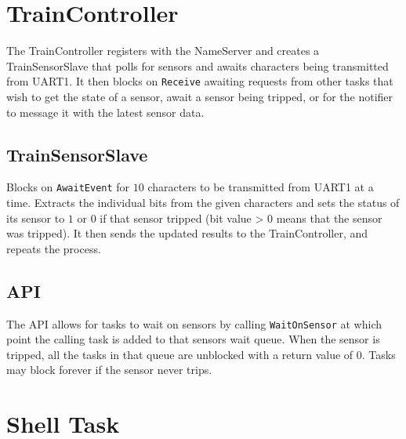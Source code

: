 \documentclass[12pt]{article}
\begin{document}
\section{TrainController}
The TrainController registers with the NameServer and creates a TrainSensorSlave that polls for sensors and awaits characters being transmitted from UART1.  It then blocks on \texttt{Receive} awaiting requests from other tasks that wish to get the state of a sensor, await a sensor being tripped, or for the notifier to message it with the latest sensor data.
\\
\subsection{TrainSensorSlave}
Blocks on \texttt{AwaitEvent} for $10$ characters to be transmitted from UART1 at a time.  Extracts the individual bits from the given characters and sets the status of its sensor to $1$ or $0$ if that sensor tripped (bit value > 0 means that the sensor was tripped).  It then sends the updated results to the TrainController, and repeats the process.
\\[1\baselineskip]
\subsection{API}
The API allows for tasks to wait on sensors by calling \texttt{WaitOnSensor} at which point the calling task is added to that sensors wait queue.  When the sensor is tripped, all the tasks in that queue are unblocked with a return value of $0$.  Tasks may block forever if the sensor never trips.
\\[2\baselineskip]

\section{Shell Task}
\end{document}
